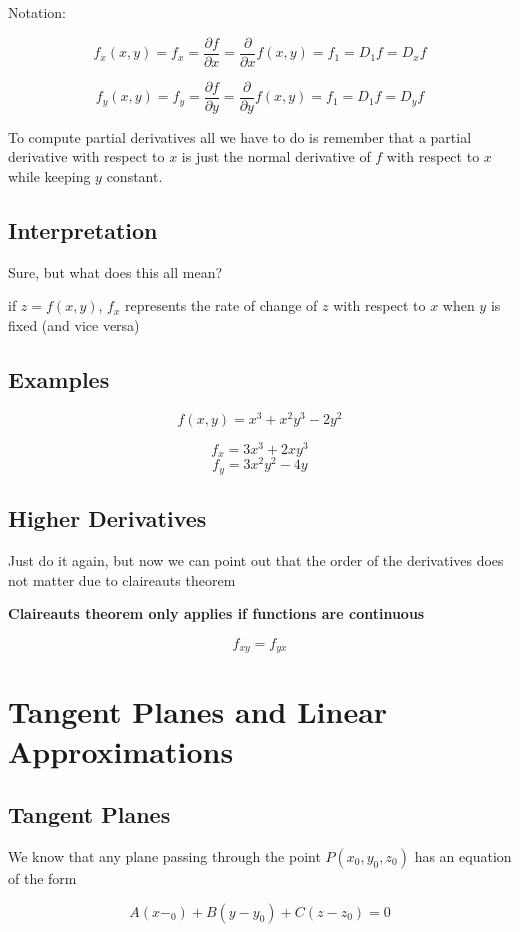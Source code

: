 \documentclass{article}
\begin{document}
Notation:

$$f_x(x,y) = f_x = \frac{\partial f}{\partial x} = \frac{\partial}{\partial x}f(x,y) = f_1 = D_1f = D_xf$$

$$f_y(x,y) = f_y = \frac{\partial f}{\partial y} = \frac{\partial}{\partial y}f(x,y) = f_1 = D_1f = D_yf$$

To compute partial derivatives all we have to do is remember that a partial derivative with respect to $x$ is just the normal derivative of $f$ with respect to $x$ while keeping $y$ constant.

\subsection{Interpretation}

Sure, but what does this all mean?

if $z = f(x,y)$, $f_x$ represents the rate of change of $z$ with respect to $x$ when $y$ is fixed (and vice versa) 

\subsection{Examples}

$$f(x,y) = x^3 + x^2y^3 -2y^2$$


$$f_x = 3x^3 + 2xy^3$$
$$f_y = 3x^2y^2 - 4y$$

\subsection{Higher Derivatives}

Just do it again, but now we can point out that the order of the derivatives does not matter due to claireauts theorem

\textbf{Claireauts theorem only applies if functions are continuous}

$$f_{xy} = f_{yx}$$

\newpage
\section{Tangent Planes and Linear Approximations}


\subsection{Tangent Planes}
We know that any plane passing through the point $P(x_0,y_0,z_0)$ has an equation of the form 

$$A(x-_0) + B(y-y_0) + C(z-z_0) = 0$$
\end{document}
